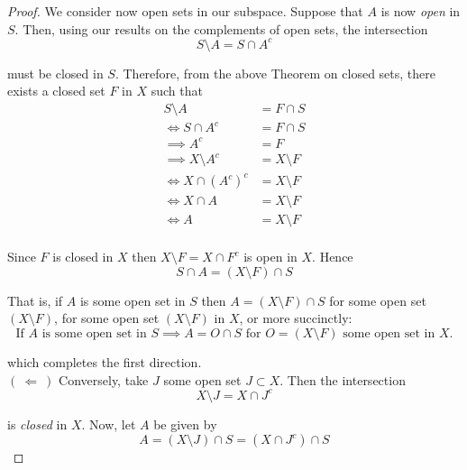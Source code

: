 \documentclass[12pt]{article}
\newcommand{\limplies}{~\Longleftarrow ~} %
\newcommand{\rimplies}{\implies} %
\begin{document}
\begin{proof} We consider now open sets in our subspace. Suppose that $A$ is now {\em open} in $S$. Then, using our results on the complements of open sets, the intersection
\begin{equation*}
	S \setminus A = S \cap A^c
\end{equation*}

must be closed in $S$. Therefore, from the above Theorem on closed sets, there exists  a closed set $F$ in $X$ such that
\begin{align*}
	S \setminus A &= F \cap S \\
	\iff S\cap A^c &= F \cap S \\
	\implies A^c &= F  \\
	\implies X \setminus A^c &= X \setminus F \\
	\iff X \cap \left(A^c\right)^c &= X \setminus F \\
	\iff X \cap A &= X \setminus F \\
	\iff A &= X \setminus F  \\
\end{align*}

Since $F$ is closed in $X$ then $X \setminus F = X \cap F^c$ is open in $X$. Hence
\begin{equation*}
	S \cap A = \left(X \setminus F\right) \cap S
\end{equation*}

That is, if $A$ is some open set in $S$ then $A = \left(X \setminus F\right) \cap S$ for some open set $\left(X \setminus F\right)$, for some open set $\left(X \setminus F\right)$ in $X$, or more succinctly:
\begin{equation*}
	\text{If $A$ is some open set in $S \implies A = O \cap S$ for $O = \left(X \setminus F\right)$ some open set in $X$.}
\end{equation*}

which completes the first direction. \\

$(\limplies)$ Conversely, take $J$ some open set $J \subset X$. Then the intersection
\begin{equation*}
	 X \setminus J = X \cap J^c
\end{equation*}

is {\em closed} in $X$. Now, let $A$ be given by
\begin{equation*}
	A = \left( X \setminus J \right) \cap S = \left( X \cap J^c \right) \cap S
\end{equation*}


\end{proof}
\end{document}
